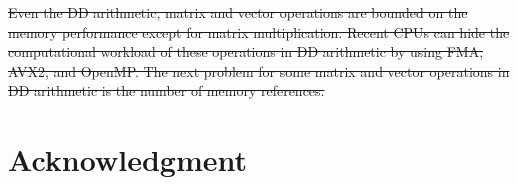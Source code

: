 \documentclass{IOS-Book-Article}
\begin{document}
\sout{Even the DD arithmetic, matrix and vector operations are bounded on the memory performance except for matrix multiplication. Recent CPUs can hide the computational workload of these operations in DD arithmetic by using FMA, AVX2, and OpenMP. The next problem for some matrix and vector operations in DD arithmetic is the number of memory references. }

\section*{Acknowledgment}
\end{document}
